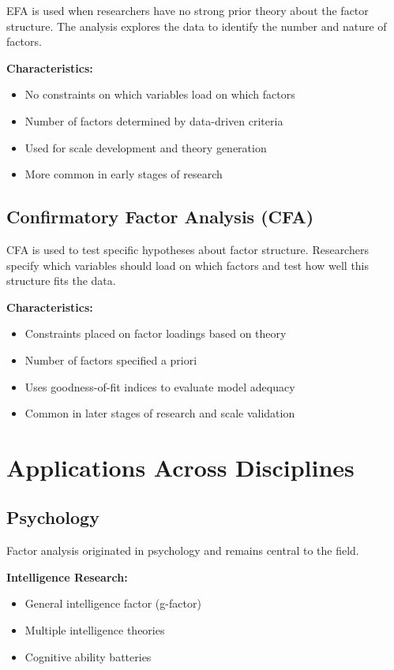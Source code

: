 \documentclass[a4paper]{tufte-book}
\begin{document}
EFA is used when researchers have no strong prior theory about the factor structure. The analysis explores the data to identify the number and nature of factors.

\textbf{Characteristics:}
\begin{itemize}
\item No constraints on which variables load on which factors
\item Number of factors determined by data-driven criteria
\item Used for scale development and theory generation
\item More common in early stages of research
\end{itemize}

\subsection{Confirmatory Factor Analysis (CFA)}

CFA is used to test specific hypotheses about factor structure. Researchers specify which variables should load on which factors and test how well this structure fits the data.

\textbf{Characteristics:}
\begin{itemize}
\item Constraints placed on factor loadings based on theory
\item Number of factors specified a priori
\item Uses goodness-of-fit indices to evaluate model adequacy
\item Common in later stages of research and scale validation
\end{itemize}

\section{Applications Across Disciplines}

\subsection{Psychology}

Factor analysis originated in psychology and remains central to the field.

\textbf{Intelligence Research:}
\begin{itemize}
\item General intelligence factor (g-factor)
\item Multiple intelligence theories
\item Cognitive ability batteries
\end{itemize}
\end{document}
